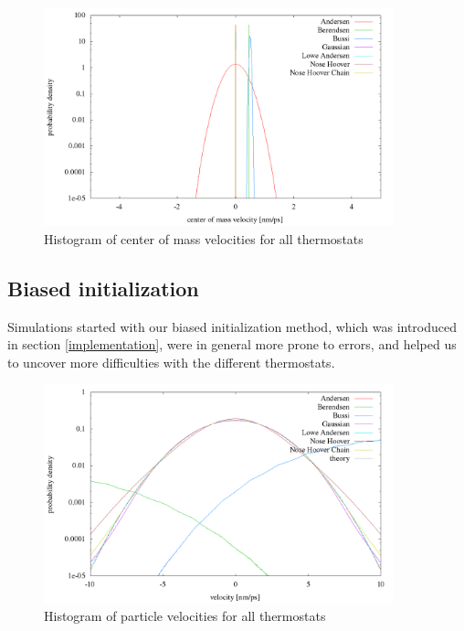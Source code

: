 \begin{figure}[H]
\centering
\includegraphics[width=0.9\textwidth]{./graphics/Histogramm_schwerVel_rand_T=20_p=64.png}
\caption{Histogram of center of mass velocities for all thermostats}
\label{im:schwerVel_rand}
\end{figure} 

\subsection{Biased initialization}
Simulations started with our biased initialization method, which was introduced in section \ref{implementation}, were in general more prone to errors, and helped us to uncover more difficulties with the different thermostats. 

\begin{figure}[H]
\centering
  	\includegraphics[width=0.9\textwidth]{./graphics/Histogramm_velocity_one_T=20_p=64.png}
  	\caption{Histogram of particle velocities for all thermostats}
    \label{im:vel_one}
\end{figure} 


